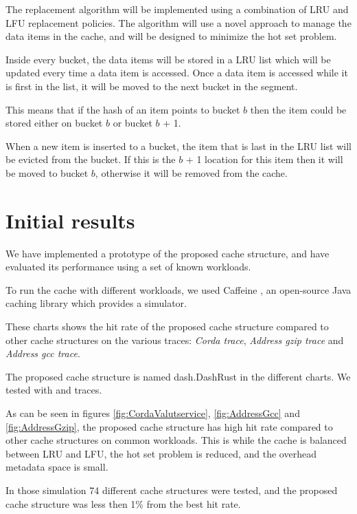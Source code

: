 \documentclass[12pt]{article}
\begin{document}
The replacement algorithm will be implemented using a combination of LRU and LFU replacement policies. The algorithm will use a novel approach to manage the data items in the cache, and will be designed to minimize the hot set problem.

Inside every bucket, the data items will be stored in a LRU list which will be updated every time a data item is accessed. Once a data item is accessed while it is first in the list, it will be moved to the next bucket in the segment.

This means that if the hash of an item points to bucket $b$ then the item could be stored either on bucket $b$ or bucket $b$ + 1.

When a new item is inserted to a bucket, the item that is last in the LRU list will be evicted from the bucket. If this is the $b$ + 1 location for this item then it will be moved to bucket $b$, otherwise it will be removed from the cache.

\section{Initial results}

We have implemented a prototype of the proposed cache structure, and have evaluated its performance using a set of known workloads.

To run the cache with different workloads, we used Caffeine \cite{caffeine}, an open-source Java caching library which provides a simulator.

These charts shows the hit rate of the proposed cache structure compared to other cache structures on the various traces: \textit{Corda trace}, \textit{Address gzip trace} and \textit{Address gcc trace}.

The proposed cache structure is named dash.DashRust in the different charts. We tested with \cite{CordaTrace} and \cite{AddressTrace} traces.

As can be seen in figures \ref{fig:CordaValutservice}, \ref{fig:AddressGcc} and \ref{fig:AddressGzip}, the proposed cache structure has high hit rate compared to other cache structures on common workloads. This is while the cache is balanced between LRU and LFU, the hot set problem is reduced, and the overhead metadata space is small.

In those simulation 74 different cache structures were tested, and the proposed cache structure was less then 1\% from the best hit rate.
\end{document}
